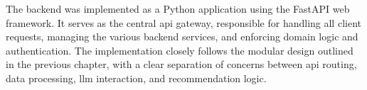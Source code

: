 The backend was implemented as a Python application using the FastAPI web framework. It serves as the central \acs{api} gateway, responsible for handling all client requests, managing the various backend services, and enforcing domain logic and authentication. The implementation closely follows the modular design outlined in the previous chapter, with a clear separation of concerns between \acs{api} routing, data processing, \ac{llm} interaction, and recommendation logic.